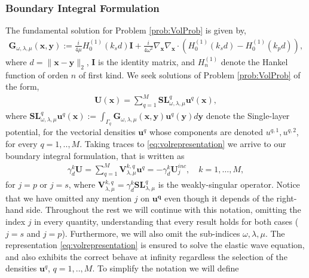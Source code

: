 \documentclass{article}
\newcommand{\vx}{\bm{x}}
\begin{document}
\subsubsection{Boundary Integral Formulation}

The fundamental solution for Problem \ref{prob:VolProb} is given by,  
\begin{align*}
\mathbf{G}_{\omega,\lambda, \mu} (\mathbf{x}, \mathbf{y}) := 
\frac{i}{4 \mu} H^{(1)}_0(k_s d)\mathbf{I}+ \frac{i}{4\omega^2} \nabla_\mathbf{x} 
\nabla_\mathbf{x} \cdot \left( 
H^{(1)}_0(k_sd ) - H^{(1)}_0(k_p d)
\right),
\end{align*}
where $d = \|\mathbf{x} -\mathbf{y}\|_2$, $\mathbf{I}$ is the identity matrix, and $H^{(1)}_n$ denote the Hankel function of orden $n$ of first kind. We seek solutions of Problem \ref{prob:VolProb} of the form, 
\begin{align}
\label{eq:volrepresentation}
\mathbf{U}(\vx) = \sum_{q=1}^M \mathbf{SL}^q_{\omega,\lambda, \mu} \mathbf{u}^q (\vx) , 
\end{align}
where $\mathbf{SL}^q_{\omega,\lambda, \mu}\mathbf{u}^q(\vx) := \int_{\Gamma_q} \mathbf{G}_{\omega,\lambda, \mu} (\mathbf{x}, \mathbf{y}) \mathbf{u}^q(\mathbf{y})d\mathbf{y}$ denote the Single-layer potential, for the vectorial densities $\mathbf{u}^q$ whose components are denoted $u^{q,1},u^{q,2}$, for every $q = 1,..,M$. Taking traces to \eqref{eq:volrepresentation} we arrive to our boundary integral formulation, that is written as  
\begin{align}
\label{eq:bieformulation}
\gamma^k_d \mathbf{U} = \sum_{q=1}^M \mathbf{V}^{k,q}_{\lambda,\mu} \mathbf{u}^q = -\gamma^k_d \mathbf{U}^{inc}_j, \quad k =1,\hdots,M,
\end{align}
for $j = p $ or $j =s $, where $ \mathbf{V}^{k,q}_{\lambda,\mu} = \gamma_d^k  \mathbf{SL}^q_{\lambda,\mu }$ is the weakly-singular operator.
Notice that we have omitted any mention $j$ on $\mathbf{u^q}$ even though it depends of the right-hand side. Throughout the rest we will continue with this notation, omitting the index $j$ in every quantity, understanding that every result holds for both cases ($j = s$ and $j=p$). Furthermore, we will also omit the sub-indices $\omega, \lambda, \mu$.
 The representation \eqref{eq:volrepresentation} is ensured to solve the elastic wave equation, and also exhibits the correct behave at infinity regardless the selection of the densities $\mathbf{u}^q$, $q=1,..,M$. To simplify the notation we will define 
\end{document}
